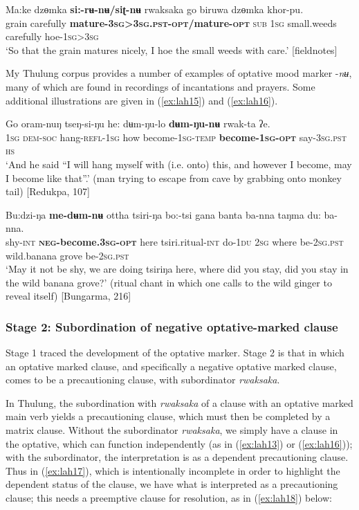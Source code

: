 \documentclass[output=paper,colorlinks,citecolor=brown,
]{langscibook}
\begin{document}
\ea \label{ex:lah14}
\gll Ma:ke dzɵmka \textbf{si:-rʉ-nʉ/siʈ-nʉ} rwaksaka go biruwa dzɵmka khor-pu. \\
grain carefully \textbf{mature-\textsc{3sg>3sg.pst-opt}/mature-\textsc{opt}} \textsc{sub} \textsc{1sg} small.weeds carefully hoe-\textsc{1sg>3sg} \\
\glt `So that the grain matures nicely, I hoe the small weeds with care.' [fieldnotes]
\z

My Thulung corpus provides a number of examples of optative mood marker \nobreakdash-\textit{nʉ}, many of which are found in recordings of incantations and prayers. Some additional illustrations are given in (\ref{ex:lah15}) and (\ref{ex:lah16}).


\ea \label{ex:lah15}
\gll Go oram-nuŋ tseŋ-si-ŋu  he: dʉm-ŋu-lo \textbf{dʉm-ŋu-nʉ} rwak-ta ʔe. \\
\textsc{1sg} \textsc{dem-soc} hang-\textsc{refl-1sg} how become-\textsc{1sg-temp} \textbf{become-\textsc{1sg-opt}} say\textsc{-3sg.pst} \textsc{hs} \\
\glt `And he said ``I will hang myself with (i.e. onto) this, and however I become, may I become like that''.' (man trying to escape from cave by grabbing onto monkey tail) [Redukpa, 107]
\z


\ea \label{ex:lah16}
\gll Bu:dzi-ŋa \textbf{me-dʉm-nʉ}  ottha tsiri-ŋa bo:-tsi gana banta ba-nna taŋma du: ba-nna. \\
shy-\textsc{int} \textbf{\textsc{neg-}become.3\textsc{sg-opt}} here tsiri.ritual-\textsc{int} do-\textsc{1du} \textsc{2sg} where be-\textsc{2sg.pst} wild.banana grove be-\textsc{2sg.pst} \\
\glt `May it not be shy, we are doing tsiriŋa here, where did you stay, did you stay in the wild banana grove?' (ritual chant in which one calls to the wild ginger to reveal itself) [Bungarma, 216]
\z


\subsubsection{Stage 2: Subordination of negative optative-marked clause}
\label{subsubsec:stage2}

Stage 1 traced the development of the optative marker. Stage 2 is that in which an optative marked clause, and specifically a negative optative marked clause, comes to be a precautioning clause, with subordinator \textit{rwaksaka}. 


In Thulung, the subordination with \textit{rwaksaka} of a clause with an optative marked main verb yields a precautioning clause, which must then be completed by a matrix clause. Without the subordinator \textit{rwaksaka}, we simply have a clause in the optative, which can function independently (as in (\ref{ex:lah13}) or (\ref{ex:lah16})); with the subordinator, the interpretation is as a dependent precautioning clause. Thus in (\ref{ex:lah17}), which is intentionally incomplete in order to highlight the dependent status of the clause, we have what is interpreted as a precautioning clause; this needs a preemptive clause for resolution, as in (\ref{ex:lah18}) below: 
\end{document}
